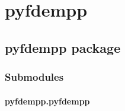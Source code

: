 \documentclass[letterpaper,10pt,english]{sphinxmanual}
\begin{document}
\sphinxstepscope


\chapter{pyfdempp}
\label{\detokenize{modules:pyfdempp}}\label{\detokenize{modules::doc}}
\sphinxstepscope


\section{pyfdempp package}
\label{\detokenize{pyfdempp:pyfdempp-package}}\label{\detokenize{pyfdempp::doc}}

\subsection{Submodules}
\label{\detokenize{pyfdempp:submodules}}

\subsubsection{pyfdempp.pyfdempp}
\label{\detokenize{pyfdempp:module-pyfdempp.pyfdempp}}\label{\detokenize{pyfdempp:pyfdempp-pyfdempp}}
\end{document}
